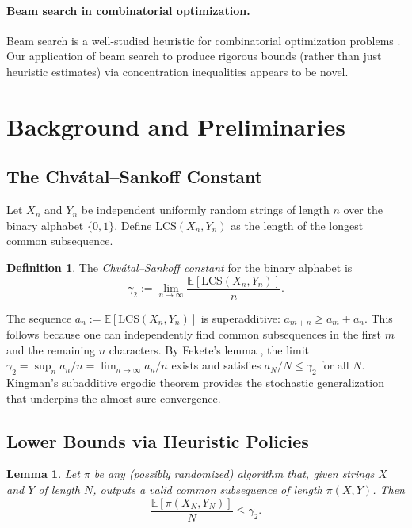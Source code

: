\documentclass[11pt,a4paper]{article}
\newtheorem{lemma}[theorem]{Lemma}
\theoremstyle{definition}
\newtheorem{definition}{Definition}
\newcommand{\E}{\mathbb{E}}
\newcommand{\LCS}{\mathrm{LCS}}
\begin{document}
\paragraph{Beam search in combinatorial optimization.}
Beam search is a well-studied heuristic for combinatorial optimization problems
\citep{huber2021}. Our application of beam search to produce rigorous bounds
(rather than just heuristic estimates) via concentration inequalities appears
to be novel.

\section{Background and Preliminaries}
\label{sec:background}

\subsection{The Chv\'{a}tal--Sankoff Constant}

Let $X_n$ and $Y_n$ be independent uniformly random strings of length $n$ over
the binary alphabet $\{0, 1\}$. Define $\LCS(X_n, Y_n)$ as the length of the
longest common subsequence.

\begin{definition}
  The \emph{Chv\'{a}tal--Sankoff constant} for the binary alphabet is
  \begin{equation}
    \gamma_2 := \lim_{n \to \infty} \frac{\E[\LCS(X_n, Y_n)]}{n}.
    \label{eq:gamma2}
  \end{equation}
\end{definition}

The sequence $a_n := \E[\LCS(X_n, Y_n)]$ is superadditive: $a_{m+n} \geq
a_m + a_n$. This follows because one can independently find common
subsequences in the first $m$ and the remaining $n$ characters. By Fekete's
lemma \citep{fekete1923}, the limit $\gamma_2 = \sup_n a_n / n = \lim_{n
\to \infty} a_n / n$ exists and satisfies $a_N / N \leq \gamma_2$ for all $N$.
Kingman's subadditive ergodic theorem \citep{kingman1968} provides the
stochastic generalization that underpins the almost-sure convergence.

\subsection{Lower Bounds via Heuristic Policies}

\begin{lemma}
  \label{lem:heuristic_lb}
  Let $\pi$ be any (possibly randomized) algorithm that, given strings $X$ and
  $Y$ of length $N$, outputs a valid common subsequence of length $\pi(X, Y)$.
  Then
  \begin{equation}
    \frac{\E[\pi(X_N, Y_N)]}{N} \leq \gamma_2.
    \label{eq:heuristic_lb}
  \end{equation}
\end{lemma}
\end{document}
